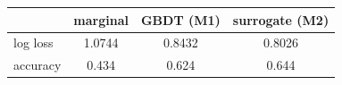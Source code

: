 \begin{tabular}{lccc}
\toprule
 & marginal & GBDT (M1) & surrogate (M2) \\
\midrule
log loss & 1.0744 & 0.8432 & 0.8026 \\
accuracy & 0.434 & 0.624 & 0.644 \\
\bottomrule
\end{tabular}
